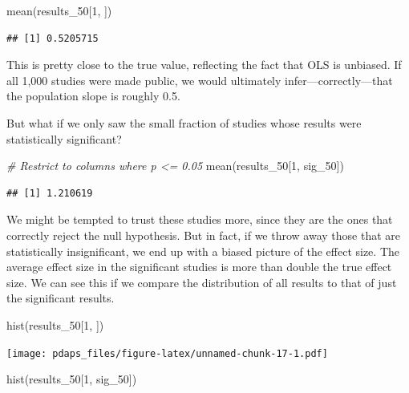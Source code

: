 \documentclass[
  12pt,
  oneside,openany]{book}
\newenvironment{Shaded}{\begin{snugshade}}{\end{snugshade}}
\newcommand{\CommentTok}[1]{\textcolor[rgb]{0.56,0.35,0.01}{\textit{#1}}}
\newcommand{\DecValTok}[1]{\textcolor[rgb]{0.00,0.00,0.81}{#1}}
\newcommand{\FunctionTok}[1]{\textcolor[rgb]{0.00,0.00,0.00}{#1}}
\newcommand{\NormalTok}[1]{#1}
\begin{document}
\begin{Shaded}
\begin{Highlighting}[]
\FunctionTok{mean}\NormalTok{(results\_50[}\DecValTok{1}\NormalTok{, ])}
\end{Highlighting}
\end{Shaded}

\begin{verbatim}
## [1] 0.5205715
\end{verbatim}

This is pretty close to the true value, reflecting the fact that OLS is unbiased. If all 1,000 studies were made public, we would ultimately infer---correctly---that the population slope is roughly 0.5.

But what if we only saw the small fraction of studies whose results were statistically significant?

\begin{Shaded}
\begin{Highlighting}[]
\CommentTok{\# Restrict to columns where p \textless{}= 0.05}
\FunctionTok{mean}\NormalTok{(results\_50[}\DecValTok{1}\NormalTok{, sig\_50])}
\end{Highlighting}
\end{Shaded}

\begin{verbatim}
## [1] 1.210619
\end{verbatim}

We might be tempted to trust these studies more, since they are the ones that correctly reject the null hypothesis. But in fact, if we throw away those that are statistically insignificant, we end up with a biased picture of the effect size. The average effect size in the significant studies is more than double the true effect size. We can see this if we compare the distribution of all results to that of just the significant results.

\begin{Shaded}
\begin{Highlighting}[]
\FunctionTok{hist}\NormalTok{(results\_50[}\DecValTok{1}\NormalTok{, ])}
\end{Highlighting}
\end{Shaded}

\texttt{[image: pdaps\_files/figure-latex/unnamed-chunk-17-1.pdf]}

\begin{Shaded}
\begin{Highlighting}[]
\FunctionTok{hist}\NormalTok{(results\_50[}\DecValTok{1}\NormalTok{, sig\_50])}
\end{Highlighting}
\end{Shaded}
\end{document}
